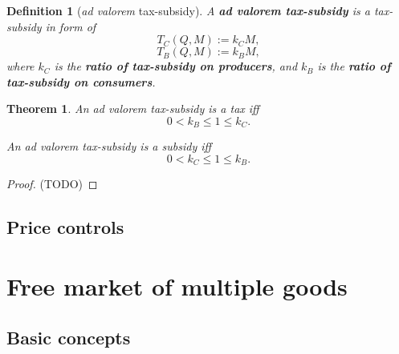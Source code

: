 \documentclass{article}
\newtheorem{theorem}{Theorem}
\newtheorem{definition}{Definition}
\begin{document}
\begin{definition}[\textit{ad valorem} tax-subsidy]
\label{ad valorem tax-subsidy}
A \textbf{\textit{ad valorem} tax-subsidy} is a tax-subsidy in form of
$$T_C\left(Q,M\right):=k_CM,$$
$$T_B\left(Q,M\right):=k_BM,$$
where $k_C$ is the \textbf{ratio of tax-subsidy on producers},
and $k_B$ is the \textbf{ratio of tax-subsidy on consumers}.
\end{definition}

\begin{theorem}
An \textit{ad valorem} tax-subsidy is a tax iff
$$0<k_B\le1\le k_C.$$

An \textit{ad valorem} tax-subsidy is a subsidy iff
$$0<k_C\le1\le k_B.$$
\end{theorem}
\begin{proof}
(TODO) %
\end{proof}

\subsection{Price controls}

\section{Free market of multiple goods}

\subsection{Basic concepts}
\end{document}
